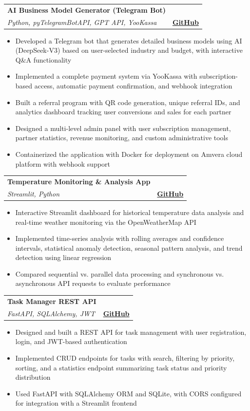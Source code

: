 \documentclass[a4paper,11pt]{article}
\makeatletter
\newcommand{\resumeProject}[4]{
\vspace{0.5mm}\item
    \begin{tabular*}{0.98\textwidth}[t]{l@{\extracolsep{\fill}}r}
        \textbf{#1} & \textit{\footnotesize{#3}} \\
        \footnotesize{\textit{#2}} & \footnotesize{#4}
    \end{tabular*}
    \vspace{-2.4mm}
}
\newcommand{\resumeItemListStart}{\begin{justify}\begin{itemize}[leftmargin=3ex, rightmargin=2ex, noitemsep,labelsep=1.2mm,itemsep=0mm]\small}
\newcommand{\resumeItemListEnd}{\end{itemize}\end{justify}\vspace{-2mm}}
\makeatother
\begin{document}
    \resumeProject
      {AI Business Model Generator (Telegram Bot)} %
      {Python, pyTelegramBotAPI, GPT API, YooKassa} %
      {} %
      {\href{https://github.com/Ra1fY/TeleBot}{\textbf{GitHub}}} %
      \resumeItemListStart
        \item {Developed a Telegram bot that generates detailed business models using AI (DeepSeek-V3) based on user-selected industry and budget, with interactive Q\&A functionality}
        \item {Implemented a complete payment system via YooKassa with subscription-based access, automatic payment confirmation, and webhook integration}
        \item {Built a referral program with QR code generation, unique referral IDs, and analytics dashboard tracking user conversions and sales for each partner}
        \item {Designed a multi-level admin panel with user subscription management, partner statistics, revenue monitoring, and custom administrative tools}
        \item {Containerized the application with Docker for deployment on Amvera cloud platform with webhook support}
      \resumeItemListEnd
    
    \resumeProject
      {Temperature Monitoring \& Analysis App} %
      {Streamlit, Python} %
      {} %
      {\href{https://github.com/Ra1fY/Streamlit}{\textbf{GitHub}}} %
      \resumeItemListStart
        \item {Interactive Streamlit dashboard for historical temperature data analysis and real-time weather monitoring via the OpenWeatherMap API}
        \item {Implemented time-series analysis with rolling averages and confidence intervals, statistical anomaly detection, seasonal pattern analysis, and trend detection using linear regression}
        \item {Compared sequential vs. parallel data processing and synchronous vs. asynchronous API requests to evaluate performance}
      \resumeItemListEnd
    
     \vspace{-1mm}
     
    \resumeProject
      {Task Manager REST API} %
      {FastAPI, SQLAlchemy, JWT} %
      {} %
      {\href{https://github.com/Ra1fY/FastAPI}{\textbf{GitHub}}} %
      \resumeItemListStart
        \item {Designed and built a REST API for task management with user registration, login, and JWT-based authentication}
        \item {Implemented CRUD endpoints for tasks with search, filtering by priority, sorting, and a statistics endpoint summarizing task status and priority distribution}
        \item {Used FastAPI with SQLAlchemy ORM and SQLite, with CORS configured for integration with a Streamlit frontend}
      \resumeItemListEnd
    
\end{document}
